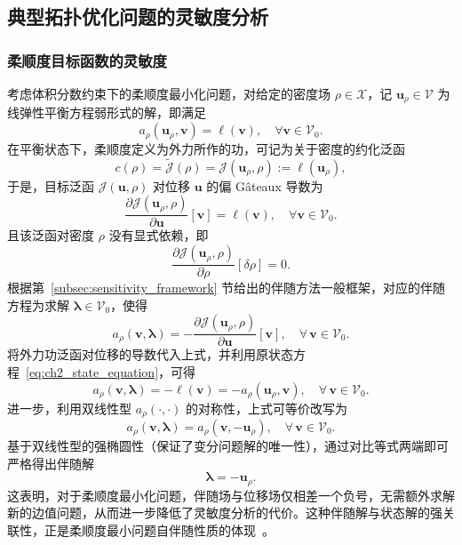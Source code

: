 \subsection{典型拓扑优化问题的灵敏度分析}
\label{subsec:sensitivity_derivation}

\subsubsection*{柔顺度目标函数的灵敏度}

考虑体积分数约束下的柔顺度最小化问题，对给定的密度场 $\rho\in\mathcal{X}$，记 $\boldsymbol{u}_\rho\in\mathcal{V}$ 为线弹性平衡方程弱形式的解，即满足
\begin{equation}
	a_\rho(\boldsymbol{u}_\rho,\boldsymbol{v}) = \ell(\boldsymbol{v}),\quad \forall \boldsymbol{v}\in\mathcal{V}_0.
	\label{eq:ch2_state_equation}
\end{equation}
在平衡状态下，柔顺度定义为外力所作的功，可记为关于密度的约化泛函
\[
c(\rho) = \tilde{\mathcal{J}}(\rho) = \mathcal{J}(\boldsymbol{u}_\rho,\rho) := \ell(\boldsymbol{u}_\rho),
\]
于是，目标泛函 $\mathcal{J}(\boldsymbol{u},\rho)$ 对位移 $\boldsymbol{u}$ 的偏 Gâteaux 导数为
\[
\frac{\partial\mathcal{J}(\boldsymbol{u}_\rho,\rho)}{\partial\boldsymbol{u}}[\boldsymbol{v}] = \ell(\boldsymbol{v}),\quad \forall \boldsymbol{v}\in\mathcal{V}_0.
\]
且该泛函对密度 $\rho$ 没有显式依赖，即
\[
\frac{\partial\mathcal{J}(\boldsymbol{u}_\rho,\rho)}{\partial\rho}[\delta\rho] = 0.
\]
根据第~\ref{subsec:sensitivity_framework} 节给出的伴随方法一般框架，对应的伴随方程为求解 $\boldsymbol{\lambda}\in\mathcal{V}_0$，使得
\[
a_\rho(\boldsymbol{v},\boldsymbol{\lambda}) = -\frac{\partial\mathcal{J}( \boldsymbol{u}_\rho,\rho)}{\partial\boldsymbol{u}}[\boldsymbol{v}],\quad \forall\,\boldsymbol{v}\in\mathcal{V}_0.
\]
将外力功泛函对位移的导数代入上式，并利用原状态方程~\eqref{eq:ch2_state_equation}，可得
\[
a_\rho(\boldsymbol{v},\boldsymbol{\lambda}) = -\ell(\boldsymbol{v}) = -a_\rho(\boldsymbol{u}_\rho,\boldsymbol{v}), \quad \forall\,\boldsymbol{v}\in\mathcal{V}_0.
\]
进一步，利用双线性型 $a_\rho(\cdot,\cdot)$ 的对称性，上式可等价改写为
\[
a_\rho(\boldsymbol{v},\boldsymbol{\lambda}) = a_\rho(\boldsymbol{v},-\boldsymbol{u}_\rho), \quad \forall\,\boldsymbol{v}\in\mathcal{V}_0.
\]
基于双线性型的强椭圆性（保证了变分问题解的唯一性），通过对比等式两端即可严格得出伴随解
\[
\boldsymbol{\lambda} = -\boldsymbol{u}_\rho.
\]
这表明，对于柔顺度最小化问题，伴随场与位移场仅相差一个负号，无需额外求解新的边值问题，从而进一步降低了灵敏度分析的代价。这种伴随解与状态解的强关联性，正是柔顺度最小问题自伴随性质的体现~\cite{bendsoeTopologyOptimization2004a}。

